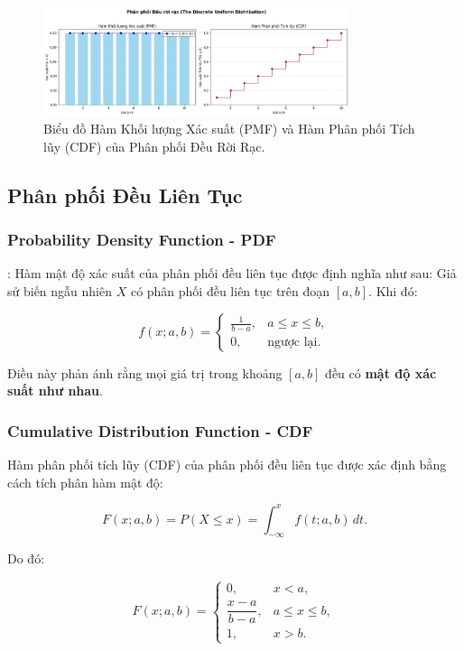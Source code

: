 \begin{figure}[h!]
    \centering
    \includegraphics[width=0.8\textwidth]{images/Uniform_PMF_and_CDF.png}
    \caption{Biểu đồ Hàm Khối lượng Xác suất (PMF) và Hàm Phân phối Tích lũy (CDF) của Phân phối Đều Rời Rạc.}
    \label{fig:uniform_disc_dist}
\end{figure}

\subsection{Phân phối Đều Liên Tục}
\subsubsection{Probability Density Function - PDF}:
Hàm mật độ xác suất của phân phối đều liên tục được định nghĩa như sau:  
Giả sử biến ngẫu nhiên \( X \) có phân phối đều liên tục trên đoạn \([a, b]\). Khi đó:

\[
f(x; a, b) =
\begin{cases}
\displaystyle \frac{1}{b - a}, & a \le x \le b, \\[1em]
0, & \text{ngược lại}.
\end{cases}
\]

Điều này phản ánh rằng mọi giá trị trong khoảng \([a, b]\) đều có \textbf{mật độ xác suất như nhau}.


\subsubsection{Cumulative Distribution Function - CDF}

Hàm phân phối tích lũy (CDF) của phân phối đều liên tục được xác định bằng cách tích phân hàm mật độ:

\[
F(x; a, b) = P(X \le x) = \int_{-\infty}^x f(t; a, b)\, dt.
\]

Do đó:

\[
F(x; a, b) =
\begin{cases}
0, & x < a, \\[0.8em]
\dfrac{x - a}{b - a}, & a \le x \le b, \\[1em]
1, & x > b.
\end{cases}
\]

